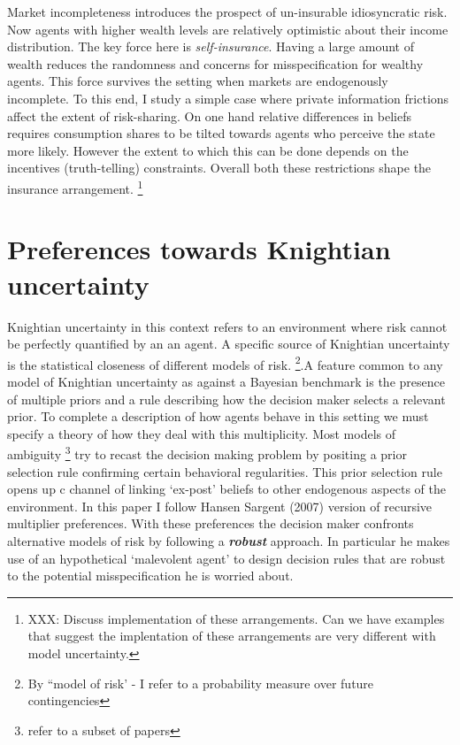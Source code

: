 \documentclass[12pt]{article}
\begin{document}
Market incompleteness introduces the prospect of un-insurable idiosyncratic risk. Now agents with higher wealth levels are relatively optimistic about their income distribution. The key force here is \emph{self-insurance}. Having a large amount of wealth reduces the randomness and concerns for misspecification for wealthy agents. This force survives the setting when markets are endogenously incomplete. To this end, I study a simple case where private information frictions affect the extent of risk-sharing. On one hand relative differences in beliefs requires consumption shares to be tilted towards agents who perceive the state more likely. However the extent to which this can be done depends on the incentives (truth-telling) constraints. Overall both these restrictions shape the insurance arrangement. \footnote{XXX: Discuss implementation of these arrangements. Can we have examples that suggest the implentation of these arrangements are very different with model uncertainty.}



\section{Preferences towards Knightian uncertainty}
\noindent Knightian uncertainty in this context refers to an environment where risk cannot be perfectly quantified by an an agent. A specific source of Knightian uncertainty is the statistical closeness of different models of risk. \footnote{By ``model of risk' - I refer to a probability measure over future contingencies}.A feature common to any model of Knightian uncertainty as against a Bayesian benchmark is the presence of multiple priors and a rule describing how the decision maker selects a relevant prior. To complete a description of how agents behave in this setting we must specify a theory of how they deal with this multiplicity. Most models of ambiguity \footnote{refer to a subset of papers } try to recast the decision making problem by positing a prior selection rule confirming certain behavioral regularities. This prior selection rule opens up c channel of linking `ex-post' beliefs to other endogenous aspects of the environment. In this paper I follow Hansen Sargent (2007) version of recursive 
multiplier preferences. With these preferences the decision maker confronts alternative models of risk by following a \textbf{\emph{robust}} approach. In particular he makes use of an hypothetical `malevolent agent' to design decision rules that are robust to the potential misspecification he is worried about. 
\end{document}
